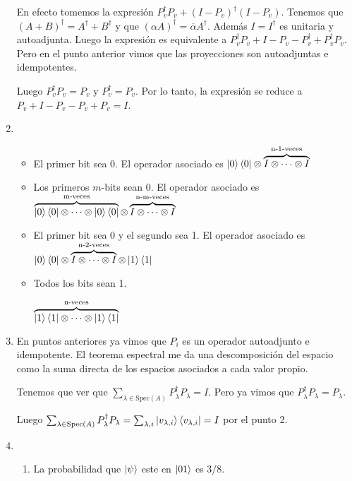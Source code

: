 \documentclass[letter,twoside,12pt]{article}
\begin{document}
\begin{enumerate}
En efecto tomemos la expresión $ P_v^\dagger P_v+(I-P_v)^\dagger(I-P_v) $. Tenemos que $ (A+B)^\dagger = A^\dagger+ B^\dagger $ y que $ (\alpha A)^\dagger = \overline{\alpha}A^\dagger $. Además $ I = I^\dagger $ es unitaria y autoadjunta. Luego la expresión es equivalente a $ P_v^\dagger P_v +I-P_v- P_v^\dagger + P_v^\dagger P_v $. Pero en el punto anterior vimos que las proyecciones son autoadjuntas e idempotentes.

Luego $ P_v^\dagger P_v = P_v $ y $ P_v^\dagger = P_v $. Por lo tanto, la expresión se reduce a $ P_v+I-P_v-P_v+P_v = I $.

\item \begin{itemize}
\item El primer bit sea 0. El operador asociado es
$ \ket{0}\bra{0} \otimes \overbrace{I \otimes\cdots\otimes  I}^\text{n-1-veces} $

\item Los primeros $ m $-bits sean 0. El operador asociado es
$ \overbrace{\ket{0}\bra{0} \otimes \cdots \otimes \ket{0}\bra{0}}^\text{m-veces} \otimes \overbrace{I \otimes\cdots\otimes  I}^\text{n-m-veces} $

\item El primer bit sea 0 y el segundo sea 1. El operador asociado es
$  \ket{0}\bra{0} \otimes \overbrace{I \otimes\cdots\otimes  I}^\text{n-2-veces} \otimes \ket{1}\bra{1}  $

\item Todos los bits sean 1.

$  \overbrace{\ket{1}\bra{1} \otimes\cdots\otimes  \ket{1}\bra{1}}^\text{n-veces} $

\end{itemize}

\item En puntos anteriores ya vimos que $ P_i $ es un operador autoadjunto e idempotente. El teorema espectral me da una descomposición del espacio como la suma directa de los espacios asociados a cada valor propio.

Tenemos que ver que $ \sum_{\lambda \in \text{Spec}(A)} P_\lambda^\dagger P_\lambda = I $. Pero ya vimos que $ P_\lambda^\dagger P_\lambda = P_\lambda $.

Luego $ \sum_{\lambda \in \text{Spec}(A)} P_\lambda^\dagger P_\lambda = \sum_{\lambda,i} \ket{v_{\lambda,i}}\bra{v_{\lambda,i}} = I $ por el punto 2.

\item \begin{enumerate}
 \item La probabilidad que $ \ket{\psi} $ este en $ \ket{01} $ es $ 3/8 $.
 

\end{enumerate}
\end{enumerate}
\end{document}
